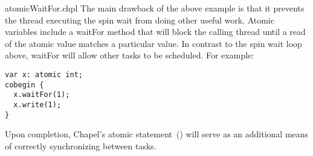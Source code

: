 \begin{chapelexample}{atomicWaitFor.chpl}
The main drawback of the above example is that it prevents the thread
executing the spin wait from doing other useful work. Atomic variables
include a waitFor method that will block the calling thread until a read
of the atomic value matches a particular value. In contrast to the spin
wait loop above, waitFor will allow other tasks to be scheduled. For
example:

\begin{chapel}
\begin{verbatim}
var x: atomic int;
cobegin {
  x.waitFor(1);
  x.write(1);
}
\end{verbatim}
\end{chapel}

\end{chapelexample}


\begin{future}
Upon completion, Chapel's atomic statement~() will serve as
an additional means of correctly synchronizing between tasks.
\end{future}

